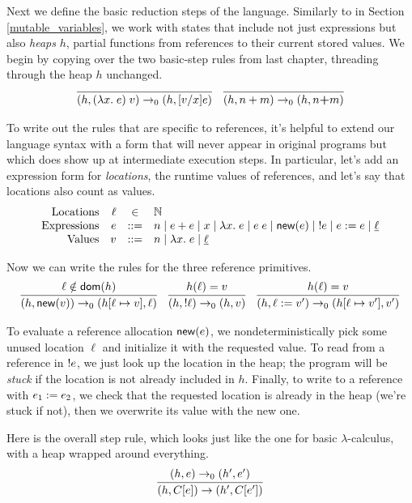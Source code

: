 \documentclass{amsbook}
\theoremstyle{definition}
\theoremstyle{remark}
\numberwithin{section}{chapter}
\numberwithin{equation}{chapter}
\begin{document}
Next we define the basic reduction steps of the language.
Similarly to in Section \ref{mutable_variables}, we work with states that include not just expressions but also \emph{heaps} $h$, partial functions from references to their current stored values.
We begin by copying over the two basic-step rules from last chapter, threading through the heap $h$ unchanged.
$$\infer{\smallstepo{(h, (\lambda x. \; e) \; v)}{(h, \subst{e}{x}{v})}}{}
\quad \infer{\smallstepo{(h, n + m)}{(h, n \textbf{+} m)}}{}$$

To write out the rules that are specific to references, it's helpful to extend our language syntax with a form that will never appear in original programs but which does show up at intermediate execution steps.
In particular, let's add an expression form for \emph{locations}, the runtime values of references, and let's say that locations also count as values.
$$\begin{array}{rrcl}
  \textrm{Locations} & \ell &\in& \mathbb N \\
  \textrm{Expressions} & e &::=& n \mid e + e \mid x \mid \lambda x. \; e \mid e \; e \mid \mathsf{new}(e) \mid \; !e \mid e := e \mid \underline{\ell} \\
  \textrm{Values} & v &::=& n \mid \lambda x. \; e \mid \underline{\ell}
\end{array}$$

\newcommand{\dom}[1]{\mathsf{dom}(#1)}
Now we can write the rules for the three reference primitives.
$$\infer{\smallstepo{(h, \newref{v})}{(\mupd{h}{\ell}{v}, \ell)}}{
  \ell \notin \dom{h}
}
\quad \infer{\smallstepo{(h, \readref{\ell})}{(h, v)}}{
  \msel{h}{\ell} = v
}
\quad \infer{\smallstepo{(h, \writeref{\ell}{v'})}{(\mupd{h}{\ell}{v'}, v')}}{
  \msel{h}{\ell} = v
}$$

To evaluate a reference allocation $\mathsf{new}(e)$, we nondeterministically pick some unused location $\ell$ and initialize it with the requested value.
To read from a reference in $!e$, we just look up the location in the heap; the program will be \emph{stuck} if the location is not already included in $h$.
Finally, to write to a reference with $e_1 := e_2$, we check that the requested location is already in the heap (we're stuck if not), then we overwrite its value with the new one.

Here is the overall step rule, which looks just like the one for basic $\lambda$-calculus, with a heap wrapped around everything.
$$\infer{\smallstep{(h, \plug{C}{e})}{(h', \plug{C}{e'})}}{
  \smallstepo{(h, e)}{(h', e')}
}$$
\end{document}
